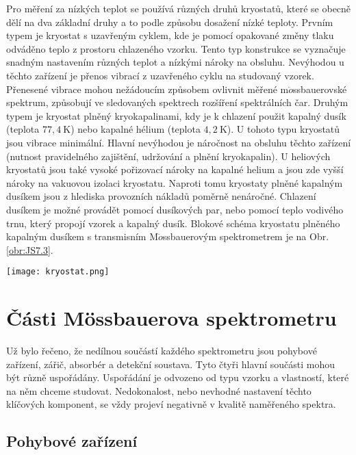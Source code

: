 \documentclass[../../main.tex]{subfiles}
\begin{document}
Pro měření za nízkých teplot se používá různých druhů kryostatů, které se obecně dělí na dva základní druhy a to podle způsobu dosažení nízké teploty. Prvním typem je kryostat s uzavřeným cyklem, kde je pomocí opakované změny tlaku odváděno teplo z prostoru chlazeného vzorku. Tento typ konstrukce se vyznačuje snadným
nastavením různých teplot a nízkými nároky na obsluhu. Nevýhodou u těchto zařízení je přenos vibrací z uzavřeného cyklu na studovaný vzorek. Přenesené vibrace mohou nežádoucím způsobem ovlivnit měřené m$\ddot{o}$ssbauerovské spektrum, způsobují ve sledovaných spektrech rozšíření spektrálních čar. Druhým typem je kryostat plněný kryokapalinami, kdy je k chlazení použit kapalný dusík (teplota $77,4 ~\mathrm{K}$) nebo kapalné hélium (teplota $4,2 ~\mathrm{K}$). U tohoto typu kryostatů jsou vibrace minimální. Hlavní nevýhodou je náročnost na obsluhu těchto zařízení (nutnost pravidelného zajištění, udržování a plnění kryokapalin). U heliových kryostatů jsou také vysoké pořizovací nároky na kapalné helium a jsou zde vyšší nároky na vakuovou izolaci kryostatu. Naproti tomu kryostaty plněné kapalným dusíkem jsou z hlediska provozních nákladů poměrně nenáročné. Chlazení dusíkem je možné provádět pomocí dusíkových par, nebo pomocí teplo vodivého trnu, který propojí vzorek a kapalný dusík. Blokové schéma kryostatu plněného kapalným dusíkem s transmisním M$\ddot{o}$ssbauerovým spektrometrem je na Obr.\ref{obr:JS7.3}.

\begin{center}
	\texttt{[image: kryostat.png]}
\end{center}

\section{Části Mössbauerova spektrometru}

Už bylo řečeno, že nedílnou součástí každého spektrometru jsou pohybové zařízení, zářič, absorbér a detekční soustava. Tyto čtyři hlavní součásti mohou být různě uspořádány. Uspořádání je odvozeno od typu vzorku a vlastností, které na něm chceme studovat. Nedokonalost, nebo nevhodné nastavení těchto klíčových komponent, se vždy projeví negativně v kvalitě naměřeného spektra.

\subsection{Pohybové zařízení}
\end{document}
